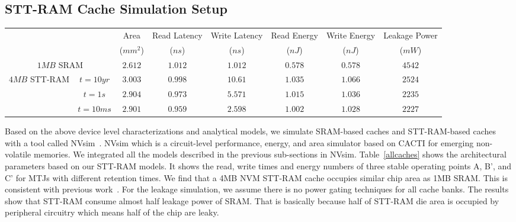 
\subsection{STT-RAM Cache Simulation Setup}

\begin{figure*} [t]
\centering
\centering
 \caption{\label{fig:currentVStime} Write current versus write pulse width for three MTJs with $10years$-, $1sec$, and $10ms$ retention at $125\,^{\circ}\mathrm{C}$}
\end{figure*}

\begin{table*}[t]
 \scriptsize
  \centering
  \caption{16-way L2 Cache Simulation Results}
  \label{allcaches}
  \begin{tabular}{| c | c | c | c | c | c | c | c |}
    \hline\hline
    \multirow{2}{*}{} & & Area  & Read Latency & Write Latency & Read Energy & Write Energy & Leakage Power\\
  & & ($mm^2$) & ($ns$) & ($ns$) & ($nJ$) & ($nJ$) & ($mW$) \\
    \hline\hline
    \multicolumn{2}{|c|}{$1MB$ SRAM} & $2.612$ & $1.012$ & $1.012$ & $0.578$ & $0.578$ & $4542$ \\
    \hline
    \multirow{3}{*}{$4MB$ STT-RAM} & $t=10yr$ & $3.003$ & $0.998$ & $10.61$ & $1.035$ & $1.066$ & $2524$ \\
    & {$t=1s$} & $2.904$ & $0.973$ & $5.571$ & $1.015$ & $1.036$ & $2235$ \\
    & {$t=10ms$} & $2.901$ & $0.959$ & $2.598$ & $1.002$ & $1.028$ & $2227$ \\
    \hline\hline
  \end{tabular}
\end{table*}

Based on the above device level characterizations and analytical models, we simulate SRAM-based
caches and STT-RAM-based caches with a tool called NVsim~\cite{CACTI:PCRAMsim}. NVsim which is a
circuit-level performance, energy, and area simulator based on CACTI for emerging non-volatile
memories. We integrated all the models described in the previous sub-sections in NVsim.
Table~\ref{allcaches} shows the architectural parameters based on our STT-RAM models. It shows the
read, write times and energy numbers of three stable operating points A, B', and C' for MTJs with different retention times. We find that a 4MB NVM STT-RAM cache occupies similar chip area as 1MB SRAM. This is consistent with previous work~\cite{CACTI:DAC08:Dong}. For the leakage simulation, we assume there is no power gating techniques for all cache banks. The results show that STT-RAM consume almost half leakage power of SRAM. That is basically because half of STT-RAM die area is occupied by peripheral circuitry which means half of the chip are leaky.

